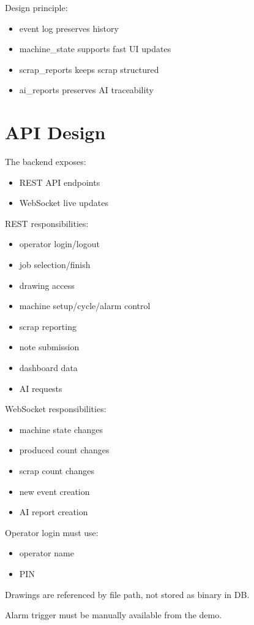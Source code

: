 \documentclass[11pt]{article}
\begin{document}
Design principle:
\begin{itemize}
\item event log preserves history
\item machine\_state supports fast UI updates
\item scrap\_reports keeps scrap structured
\item ai\_reports preserves AI traceability
\end{itemize}

\section{API Design}
The backend exposes:
\begin{itemize}
\item REST API endpoints
\item WebSocket live updates
\end{itemize}

REST responsibilities:
\begin{itemize}
\item operator login/logout
\item job selection/finish
\item drawing access
\item machine setup/cycle/alarm control
\item scrap reporting
\item note submission
\item dashboard data
\item AI requests
\end{itemize}

WebSocket responsibilities:
\begin{itemize}
\item machine state changes
\item produced count changes
\item scrap count changes
\item new event creation
\item AI report creation
\end{itemize}

Operator login must use:
\begin{itemize}
\item operator name
\item PIN
\end{itemize}

Drawings are referenced by file path, not stored as binary in DB.

Alarm trigger must be manually available from the demo.
\end{document}

